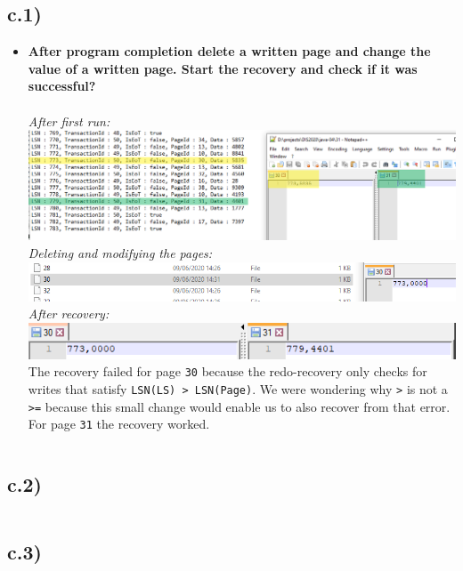 \documentclass[a4paper,english,abstract=on]{scrartcl}
\begin{document}
\subsection*{c.1)}
\begin{itemize}
	\item \textbf{After program completion delete a written page and change the value of a written page. Start the recovery and check if it was successful?}
	\\~\\
	\textit{After first run:}\\
	\includegraphics[width=\textwidth,height=\textheight,keepaspectratio]{c1_1.png}\\
	
	\textit{Deleting and modifying the pages:}\\
	\includegraphics[width=\textwidth,height=\textheight,keepaspectratio]{c1_2.png}\\
	
	\textit{After recovery:}\\
	\includegraphics[width=\textwidth,height=\textheight,keepaspectratio]{c1_3.png}\\
	
	The recovery failed for page \texttt{30} because the redo-recovery only checks for writes that satisfy \texttt{LSN(LS) > LSN(Page)}. We were wondering why \texttt{>} is not a \texttt{>=} because this small change would enable us to also recover from that error. For page \texttt{31} the recovery worked.
\end{itemize}
\begin{lstlisting}

\end{lstlisting}

\subsection*{c.2)}
\begin{lstlisting}

\end{lstlisting}

\subsection*{c.3)}
\begin{lstlisting}

\end{lstlisting}
\end{document}
